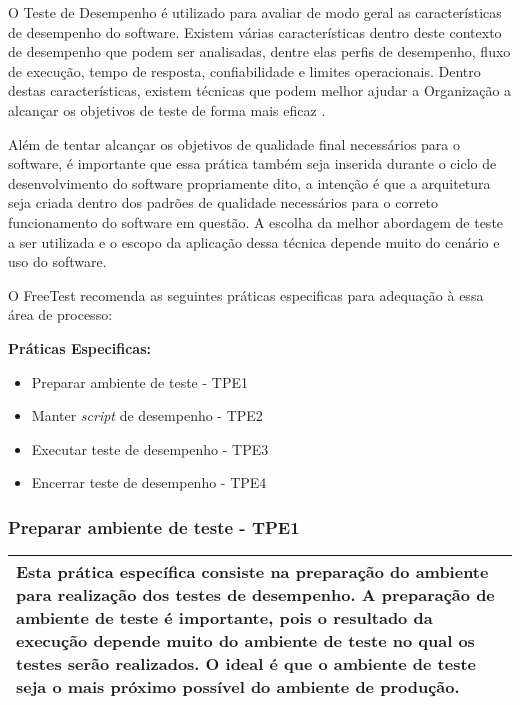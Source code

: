 O Teste de Desempenho é utilizado para avaliar de modo geral as características de desempenho do software. Existem várias características dentro deste contexto de desempenho que podem ser analisadas, dentre elas perfis de desempenho, fluxo de execução, tempo de resposta, confiabilidade e limites operacionais. Dentro destas características, existem técnicas que podem melhor ajudar a Organização a alcançar os objetivos de teste de forma mais eficaz \cite{Kruchten:2003:RUP:940320}.

Além de tentar alcançar os objetivos de qualidade final necessários para o software, é importante que essa prática também seja inserida durante o ciclo de desenvolvimento do software propriamente dito, a intenção é que a arquitetura seja criada dentro dos padrões de qualidade necessários para o correto funcionamento do software em questão. A escolha da melhor abordagem de teste a ser utilizada e o escopo da aplicação dessa técnica depende muito do cenário e uso do software.

O FreeTest recomenda as seguintes práticas especificas para adequação à essa área de processo:

\textbf{Práticas Especificas:}

\begin{itemize}    
    \item Preparar ambiente de teste - TPE1
    \item Manter \textit{script} de desempenho - TPE2
    \item Executar teste de desempenho - TPE3
    \item Encerrar teste de desempenho - TPE4
\end{itemize}

\subsubsection{Preparar ambiente de teste - TPE1}
\label{sec:tpe1}

\begin{table}[H]
\centering
\begin{tabular}{|p{130mm}|}
\hline
Esta prática específica consiste na preparação do ambiente para realização dos testes de desempenho. A preparação de ambiente de teste é importante, pois o resultado da execução depende muito do ambiente de teste no qual os testes serão realizados. O ideal é que o ambiente de teste seja o mais próximo possível do ambiente de produção.\\ 
\hline
\end{tabular}
\end{table}

